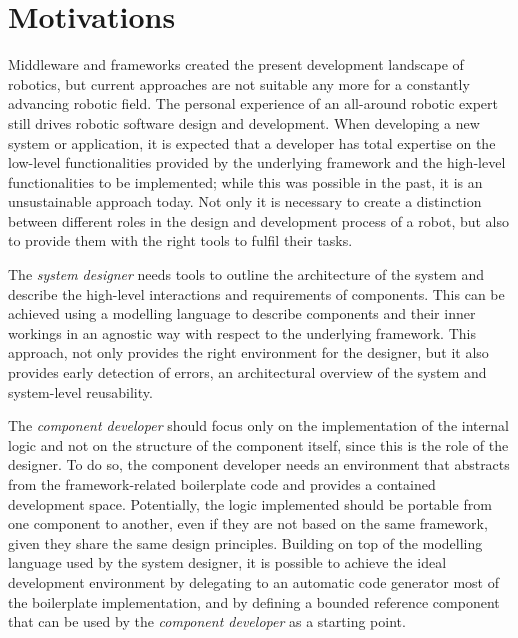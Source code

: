 \section{Motivations}
Middleware and frameworks created the present development landscape of robotics, but current approaches are not suitable any more for a constantly advancing robotic field. The personal experience of an all-around robotic expert still drives robotic software design and development. When developing a new system or application, it is expected that a developer has total expertise on the low-level functionalities provided by the underlying framework and the high-level functionalities to be implemented; while this was possible in the past, it is an unsustainable approach today. Not only it is necessary to create a distinction between different roles in the design and development process of a robot, but also to provide them with the right tools to fulfil their tasks.

The \textit{system designer} needs tools to outline the architecture of the system and describe the high-level interactions and requirements of components. This can be achieved using a modelling language to describe components and their inner workings in an agnostic way with respect to the underlying framework. This approach, not only provides the right environment for the designer, but it also provides early detection of errors, an architectural overview of the system and system-level reusability. 

The \textit{component developer} should focus only on the implementation of the internal logic and not on the structure of the component itself, since this is the role of the designer. To do so, the component developer needs an environment that abstracts from the framework-related boilerplate code and provides a contained development space. Potentially, the logic implemented should be portable from one component to another, even if they are not based on the same framework, given they share the same design principles. Building on top of the modelling language used by the system designer, it is possible to achieve the ideal development environment by delegating to an automatic code generator most of the boilerplate implementation, and by defining a bounded reference component that can be used by the \textit{component developer} as a starting point.

